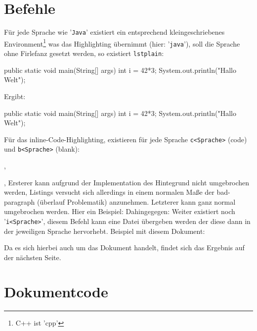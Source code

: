 \documentclass{article}
\begin{document}
\section{Befehle}
Für jede Sprache wie '\verb|Java|' existiert ein entsprechend kleingeschriebenes Environment\footnote{C++ ist 'cpp'} was das Highlighting übernimmt (hier: '\verb|java|'), soll die Sprache ohne Firlefanz gesetzt werden, so existiert \verb|lstplain|: \begin{latex}
\begin{lstplain}[language=lJava]
public static void main(String[] args) {
    int i = 42*3;
    System.out.println("Hallo Welt");
}
\end{lstplain}
\end{latex}
Ergibt:
\begin{lstplain}[language=lJava]
public static void main(String[] args) {
    int i = 42*3;
    System.out.println("Hallo Welt");
}
\end{lstplain}
Für das inline-Code-Highlighting, existieren für jede Sprache \verb|c<Sprache>| (code) und \verb|b<Sprache>| (blank):
\begin{latex}
, 
\end{latex}
, \newline
Ersterer kann aufgrund der Implementation des Hintegrund nicht umgebrochen werden, Listings versucht sich allerdings in einem normalen Maße der bad-paragraph (überlauf Problematik) anzunehmen. Letzterer kann ganz normal umgebrochen werden. Hier ein Beispiel:\newline
{}\newline
Dahingegegen:\newline
{}\medskip\newline
Weiter existiert noch '\verb|i<Sprache>|', diesem Befehl kann eine Datei übergeben werden der diese dann in der jeweiligen Sprache hervorhebt. Beispiel mit diesem Dokument:
\begin{latex}
\end{latex}
Da es sich hierbei auch um das Dokument handelt, findet sich das Ergebnis auf der nächsten Seite.
\clearpage
\section{Dokumentcode}
\end{document}
